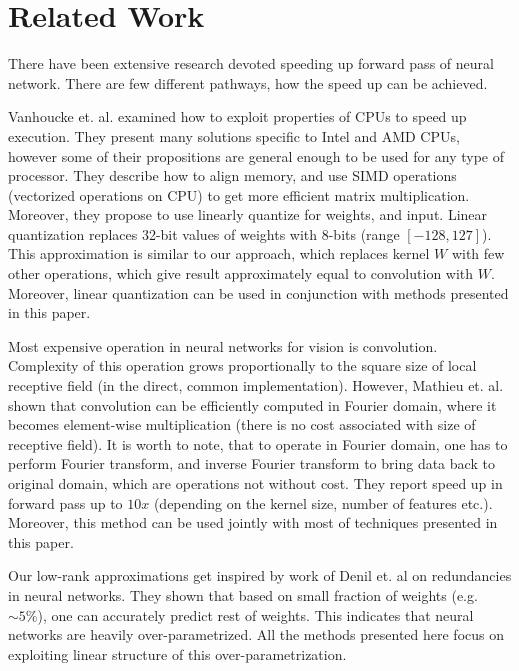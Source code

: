 \documentclass{article}
\begin{document}
\section{Related Work}
There have been extensive research devoted speeding up forward pass of neural network. 
There are few different pathways, how the speed up can be achieved. 


Vanhoucke et. al. \cite{vanhoucke2011improving} examined how to exploit properties of CPUs to speed up execution.
They present many solutions specific to Intel and AMD CPUs, however some of their propositions are general enough to be 
used for any type of processor.
They describe how to align memory, and use SIMD operations (vectorized operations on CPU) to get more efficient matrix multiplication. 
Moreover, they propose to use linearly quantize for weights, and input. Linear quantization
replaces 32-bit values of weights with 8-bits (range $[-128, 127]$). This approximation is similar
to our approach, which replaces kernel $W$ with few other operations, 
which give result approximately equal to convolution with $W$. Moreover, linear quantization
can be used in conjunction with methods presented in this paper.



Most expensive operation in neural networks for vision is convolution. Complexity of this operation
grows proportionally to the square size of local receptive field (in the direct, common implementation). 
However, Mathieu et. al. \cite{mathieu2013fast} shown that convolution can be efficiently
computed in Fourier domain, where it becomes element-wise multiplication (there is no cost
associated with size of receptive field). It is worth to note, that to operate in Fourier domain, 
one has to perform Fourier transform, and inverse Fourier transform to bring data back to original domain, which are
operations not without cost. They report speed up in forward pass up to $10x$ (depending on the kernel size, number of features etc.).
Moreover, this method can be used jointly with most of techniques presented in this paper.



Our low-rank approximations get inspired by work of Denil et. al \cite{denil2013predicting} on redundancies in neural 
networks. They shown that based on small fraction of weights (e.g. $\sim 5\%$), one can accurately 
predict rest of weights. This indicates that neural networks are heavily over-parametrized.
All the methods presented here focus on exploiting linear structure of this over-parametrization.
\end{document}
